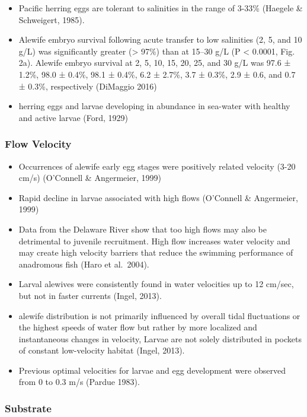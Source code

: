 \documentclass[
]{book}
\begin{document}
\begin{itemize}
\item
  Pacific herring eggs are tolerant to salinities in the range of 3-33\% (Haegele \& Schweigert, 1985).
\item
  Alewife embryo survival following acute transfer to low salinities (2, 5, and 10 g/L) was significantly greater (\textgreater{} 97\%) than at 15--30 g/L (P \textless{} 0.0001, Fig. 2a). Alewife embryo survival at 2, 5, 10, 15, 20, 25, and 30 g/L was 97.6 ± 1.2\%, 98.0 ± 0.4\%, 98.1 ± 0.4\%, 6.2 ± 2.7\%, 3.7 ± 0.3\%, 2.9 ± 0.6, and 0.7 ± 0.3\%, respectively (DiMaggio 2016)
\item
  herring eggs and larvae developing in abundance in sea-water with healthy and active larvae (Ford, 1929)
\end{itemize}

\hypertarget{flow-velocity-2}{%
\subsubsection{Flow Velocity}\label{flow-velocity-2}}

\begin{itemize}
\item
  Occurrences of alewife early egg stages were positively related velocity (3-20 cm/s) (O'Connell \& Angermeier, 1999)
\item
  Rapid decline in larvae associated with high flows (O'Connell \& Angermeier, 1999)
\item
  Data from the Delaware River show that too high flows may also be detrimental to juvenile recruitment. High flow increases water velocity and may create high velocity barriers that reduce the swimming performance of anadromous fish (Haro et al.~2004).
\item
  Larval alewives were consistently found in water velocities up to 12 cm/sec, but not in faster currents (Ingel, 2013).
\item
  alewife distribution is not primarily influenced by overall tidal fluctuations or the highest speeds of water flow but rather by more localized and instantaneous changes in velocity, Larvae are not solely distributed in pockets of constant low-velocity habitat (Ingel, 2013).
\item
  Previous optimal velocities for larvae and egg development were observed from 0 to 0.3 m/s (Pardue 1983).
\end{itemize}

\hypertarget{substrate-2}{%
\subsubsection{Substrate}\label{substrate-2}}
\end{document}
